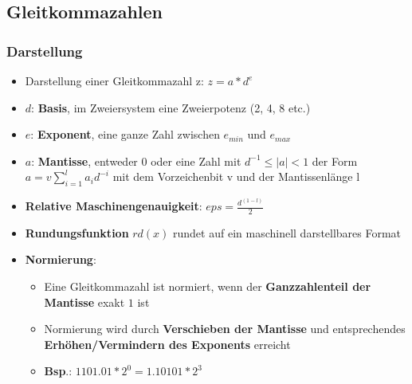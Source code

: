 \documentclass[10pt,a4paper]{article}
\begin{document}
	\subsection{Gleitkommazahlen}
	\subsubsection{Darstellung}
	\begin{itemize}
		\item Darstellung einer Gleitkommazahl z: $z = a * d^e$
		\item $d$: \textbf{Basis}, im Zweiersystem eine Zweierpotenz (2, 4, 8 etc.)
		\item $e$: \textbf{Exponent}, eine ganze Zahl zwischen $e_{min}$ und $e_{max}$
		\item $a$: \textbf{Mantisse}, entweder 0 oder eine Zahl mit $d^{-1} \leq |a| < 1$ der Form $a = v \sum_{i = 1}^{l} a_id^{-i}$ mit dem Vorzeichenbit v und der Mantissenlänge l
		\item \textbf{Relative Maschinengenauigkeit}: $eps = \frac{d^{(1-l)}}{2}$
		\item \textbf{Rundungsfunktion} $rd(x)$ rundet auf ein maschinell darstellbares Format
		\item \textbf{Normierung}:
		\begin{itemize}
			\item Eine Gleitkommazahl ist normiert, wenn der \textbf{Ganzzahlenteil der Mantisse} exakt $1$ ist
			\item Normierung wird durch \textbf{Verschieben der Mantisse} und entsprechendes \textbf{Erhöhen/Vermindern des Exponents} erreicht
			\item \textbf{Bsp}.: $1101.01 * 2^0 = 1.10101 * 2^3$
		\end{itemize}
	\end{itemize}
	\newpage
\end{document}
